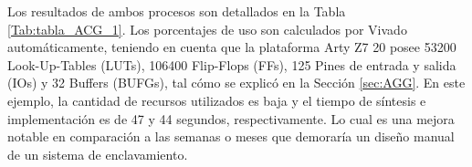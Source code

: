 	Los resultados de ambos procesos son detallados en la Tabla \ref{Tab:tabla_ACG_1}. Los porcentajes de uso son calculados por Vivado automáticamente, teniendo en cuenta que la plataforma Arty Z7 20 posee 53200 Look-Up-Tables (LUTs), 106400 Flip-Flops (FFs), 125 Pines de entrada y salida (IOs) y 32 Buffers (BUFGs), tal cómo se explicó en la Sección \ref{sec:AGG}. En este ejemplo, la cantidad de recursos utilizados es baja y el tiempo de síntesis e implementación es de 47 y 44 segundos, respectivamente. Lo cual es una mejora notable en comparación a las semanas o meses que demoraría un diseño manual de un sistema de enclavamiento.
	
	\begin{table}[H]
		{
			\caption{Síntesis e implementación del ejemplo 1 generado por el ACG.}
			\label{Tab:tabla_ACG_1}
			\centering
			\begin{center}
			\end{center}
		}    
	\end{table}	
	
	